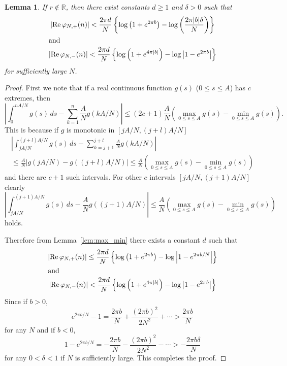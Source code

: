 \documentclass[a4paper]{amsart}
\theoremstyle{plain}
\newtheorem{lem}[thm]{Lemma}
\theoremstyle{definition}
\theoremstyle{remark}
\newcommand{\R}{\mathbb{R}}
\renewcommand{\Re}{\operatorname{Re}}
\numberwithin{equation}{section}
\begin{document}
\begin{lem}\label{lem:logN}
If $r\not\in\R$, then there exist constants $d\ge1$ and $\delta>0$ such that
\begin{gather*}
  \left|\Re\varphi_{N,+}(n)\right|
  <
  \frac{2\pi{d}}{N}
  \left\{
    \log\left(1+e^{2\pi{b}}\right)
    -
    \log\left(\frac{2\pi|b|\delta}{N}\right)
  \right\}
  \\
  \intertext{and}
  \left|\Re\varphi_{N,-}(n)\right|
  <
  \frac{2\pi{d}}{N}
  \left\{
    \log\left(1+e^{4\pi|b|}\right)
    -
    \log\left|1-e^{2\pi{b}}\right|
  \right\}
\end{gather*}
for sufficiently large $N$.
\end{lem}
\begin{proof}
First we note that if a real continuous function $g(s)$ ($0\le{s}\le{A}$) has $c$ extremes, then
\begin{equation*}
  \left|
    \int_{0}^{nA/N}g(s)\,ds
    -
    \sum_{k=1}^{n}\frac{A}{N}g(kA/N)
  \right|
  \le
  (2c+1)\frac{A}{N}
  \left(\max_{0\le{s}\le{A}}{g(s)}-\min_{0\le{s}\le{A}}{g(s)}\right).
\end{equation*}
This is because if $g$ is monotonic in $[jA/N,(j+l)A/N]$
\begin{multline*}
  \left|
    \int_{jA/N}^{(j+l)A/N}g(s)\,ds
    -
    \sum_{k=j+1}^{j+l}\frac{A}{N}g(kA/N)
  \right|
  \\
  \le
  \frac{A}{N}
  \left|
    g(jA/N)-g((j+l)A/N)
  \right|
  \le
  \frac{A}{N}
  \left(
    \max_{0\le{s}\le{A}}{g(s)}-\min_{0\le{s}\le{A}}{g(s)}
  \right)
\end{multline*}
and there are $c+1$ such intervals.
For other $c$ intervals $[jA/N,(j+1)A/N]$ clearly
\begin{equation*}
  \left|
    \int_{jA/N}^{(j+1)A/N}g(s)\,ds
    -
    \frac{A}{N}g((j+1)A/N)
  \right|
  \le
  \frac{A}{N}
  \left(
    \max_{0\le{s}\le{A}}{g(s)}-\min_{0\le{s}\le{A}}{g(s)}
  \right)
\end{equation*}
holds.
\par
Therefore from Lemma~\ref{lem:max_min} there exists a constant $d$ such that
\begin{gather*}
  \left|
    \Re\varphi_{N,+}(n)
  \right|
  \le
  \frac{2\pi{d}}{N}
  \left\{
    \log\left(1+e^{2\pi{b}}\right)
    -
    \log\left|1-e^{2\pi{b}/N}\right|
  \right\}
  \\
  \intertext{and}
  \left|\Re\varphi_{N,-}(n)\right|
  <
  \frac{2\pi{d}}{N}
  \left\{
    \log\left(1+e^{4\pi|b|}\right)
    -
    \log\left|1-e^{2\pi{b}}\right|
  \right\}
\end{gather*}
Since if $b>0$,
\begin{equation*}
  e^{2\pi{b}/N}-1
  =
  \frac{2\pi{b}}{N}+\frac{(2\pi{b})^2}{2N^2}+\cdots
  >
  \frac{2\pi{b}}{N}
\end{equation*}
for any $N$ and if $b<0$,
\begin{equation*}
  1-e^{2\pi{b}/N}
  =
  -\frac{2\pi{b}}{N}-\frac{(2\pi{b})^2}{2N^2}-\cdots
  >
  -\frac{2\pi{b}\delta}{N}
\end{equation*}
for any $0<\delta<1$ if $N$ is sufficiently large.
This completes the proof.
\end{proof}
\end{document}
